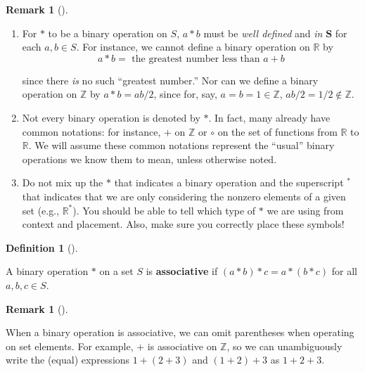 \documentclass[10pt,]{book}
\newcommand{\terminology}[1]{\textbf{#1}}
\theoremstyle{plain}
\theoremstyle{definition}
\newtheorem{definition}[theorem]{Definition}
\theoremstyle{definition}
\newtheorem{remark}[theorem]{Remark}
\theoremstyle{definition}
\theoremstyle{definition}
\numberwithin{equation}{section}
\def\Z{\mathbb{Z}}
\def\R{\mathbb{R}}
\begin{document}
\begin{remark}[]\label{remark-5}
\leavevmode%
\begin{enumerate}
\item\hypertarget{li-53}{}
          For \(*\) to be a binary operation on \(S\), \(a*b\) must be
          \emph{well defined} and \emph{in} \(\mathbf{S}\) for each \(a,b\in S\).
          For instance, we cannot define a binary operation on
          \(\R\) by
\begin{equation*}

            a*b=\text{ the greatest number less than
            \(a+b\)}
          
\end{equation*}

          since there \emph{is}  no such ``greatest number.''
          Nor can we define a binary operation on \(\Z\) by \(a*b=ab/2\),
          since for, say, \(a=b=1 \in \Z\), \(ab/2=1/2 \not\in \Z\).
\item\hypertarget{li-54}{}
          Not every binary operation is denoted by \(*\).  In fact, many already have common notations: for instance, \(+\) on \(\Z\) or \(\circ\) on the set of functions from \(\R\) to \(\R\). We will assume these common notations represent the ``usual'' binary operations we know them to mean, unless otherwise noted.
\item\hypertarget{li-55}{}
          Do not mix up the \(*\) that indicates a binary operation and the
          superscript \(^*\) that indicates that we are only considering the
          nonzero elements of a given set (e.g., \(\R^*\)). You should be
          able to tell which type of \(*\) we are using from context and
          placement. Also, make sure you correctly place these symbols!
\end{enumerate}
\end{remark}
\begin{definition}[{}]\label{definition-15}

        A binary operation \(*\) on a set \(S\) is \terminology{associative}
        if \((a*b)*c=a*(b*c)\) for all \(a,b,c\in S\).
\end{definition}
\begin{remark}[]\label{remark-6}

      When a binary operation is associative,
      we can omit parentheses when operating on set elements. For
      example, \(+\) is associative on \(\Z\), so we can unambiguously
      write the (equal) expressions \(1+(2+3)\) and \((1+2)+3\) as
      \(1+2+3\).
\end{remark}
\end{document}
